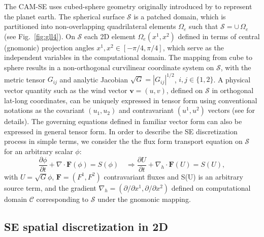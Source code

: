     The CAM-SE 
 uses   cubed-sphere geometry  originally introduced by \cite{S1972MWR}  to represent the planet earth. The  spherical   surface 
  $\mathcal{S}$ is  a patched domain,  which is partitioned  into   non-overlapping quadrilateral elements 
 $\Omega_e$ such that $\mathcal{S} = \cup \, \Omega_e$ (see Fig.~\ref{fig:gll4}). 
  On   $\mathcal{S}$  each 2D  element $\Omega_e(x^1,x^2)$  defined in terms of
 central  (gnomonic) projection angles $x^1,x^2 \in [-\pi/4, \pi/4]$, which serve as  the independent variables in the computational domain. 
 The mapping from cube to sphere results in a non-orthogonal curvilinear  coordinate system on $\mathcal{S}$, with 
 the  metric tensor $G_{ij}$ and  analytic Jacobian $ \sqrt{G} =  |G_{ij}|^{1/2}$, $i, j \in \{1,2\}$. 
 A  physical vector quantity  such as the wind vector $\mathbf{v} = (u,v)$,  defined on  $\mathcal{S}$
 in  orthogonal lat-long coordinates,  can  be uniquely
 expressed in tensor form using conventional notations as the covariant $(u_1,u_2)$ and contravariant  $(u^1, u^2)$ vectors 
 (see \cite{NTL2005MWR} for details).  The governing equations defined in familiar vector form can also be expressed 
 in  general tensor form. In order  to  describe the SE discretization process in simple terms, we consider the 
 the flux form  transport  equation on $\mathcal{S}$ for an arbitrary  scalar $\phi$:  
 \begin{equation}
 \frac{\partial \phi }{\partial t}  + \nabla \cdot \mathbf{F}(\phi)  = S(\phi)   \quad   
 \Rightarrow  \frac{\partial U }{\partial t}  + \nabla_h \cdot \mathbf{F}(U)  = S(U), 
  \label{eq:se1} 
   \end{equation} 
  with $U = \sqrt{G}  \phi $,  $\mathbf{F} = (F^1, F^2)$ contravariant fluxes and S(U)  is an arbitrary source term,
  and  the gradient $\nabla_h = (\partial/\partial x^1, \partial/\partial x^2)$ defined on computational domain $\mathcal{C}$ corresponding
  to $\mathcal{S}$ under the gnomonic mapping.  

  
\subsection{\normalsize SE spatial discretization in 2D}


